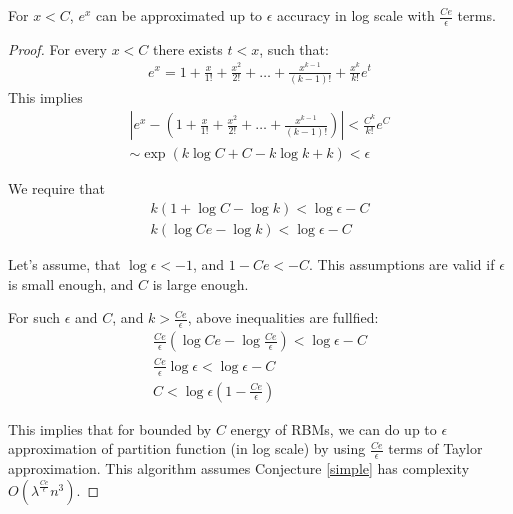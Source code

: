 \begin{lemma}
	For $x < C$, $e^x$ can be approximated up to $\epsilon$ accuracy in log scale with $\frac{Ce}{\epsilon}$ terms. 
\end{lemma}
\begin{proof}

For every $x < C$ there exists $t < x$, such that:  
\begin{align*}
	e^x = 1 + \frac{x}{1!} + \frac{x^2}{2!} + \dots + \frac{x^{k - 1}}{(k - 1)!} + \frac{x^k}{k!}e^t
\end{align*}
This implies
\begin{align*}
	|e^x - (1 + \frac{x}{1!} + \frac{x^2}{2!} + \dots + \frac{x^{k - 1}}{(k - 1)!}) | < \frac{C^k}{k!}e^C \\
	\sim \exp(k\log{C} + C - k\log{k} + k) < \epsilon
\end{align*}

We require that 
\begin{align*}
	k (1 + \log{C} - \log{k}) < \log{\epsilon} - C \\ 
	k (\log{Ce} - \log{k}) < \log{\epsilon} - C
\end{align*}

Let's assume, that $\log{\epsilon} < -1$, and $1 - Ce < -C$. This assumptions are valid if $\epsilon$ is small
enough, and $C$ is large enough.


For such $\epsilon$ and $C$, and $k > \frac{Ce}{\epsilon}$, above inequalities are fullfied:
\begin{align*}
	\frac{Ce}{\epsilon} (\log{Ce} - \log{\frac{Ce}{\epsilon}}) < \log{\epsilon} - C \\
	\frac{Ce}{\epsilon} \log{\epsilon} < \log{\epsilon} - C\\
	C < \log{\epsilon}(1 - \frac{Ce}{\epsilon})
\end{align*}

This implies that for bounded by $C$ energy of RBMs, we can do up to $\epsilon$ approximation of partition function (in log scale) by using
$\frac{Ce}{\epsilon}$ terms of Taylor approximation. This algorithm assumes Conjecture \ref{simple} has complexity
$O(\lambda^{\frac{Ce}{\epsilon}}n^3)$.

\end{proof}



